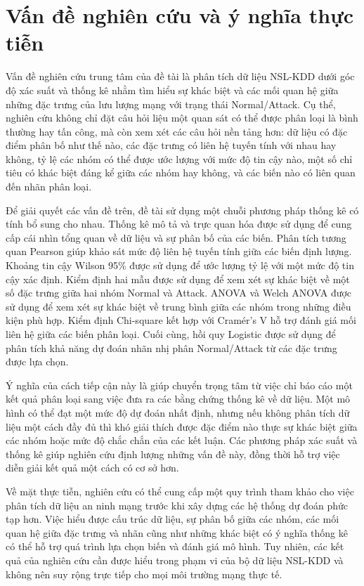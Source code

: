 \documentclass[../main.tex]{subfiles}
\begin{document}
\section{Vấn đề nghiên cứu và ý nghĩa thực tiễn}

Vấn đề nghiên cứu trung tâm của đề tài là phân tích dữ liệu NSL-KDD dưới góc độ xác suất và thống kê nhằm tìm hiểu sự khác biệt và các mối quan hệ giữa những đặc trưng của lưu lượng mạng với trạng thái Normal/Attack. Cụ thể, nghiên cứu không chỉ đặt câu hỏi liệu một quan sát có thể được phân loại là bình thường hay tấn công, mà còn xem xét các câu hỏi nền tảng hơn: dữ liệu có đặc điểm phân bố như thế nào, các đặc trưng có liên hệ tuyến tính với nhau hay không, tỷ lệ các nhóm có thể được ước lượng với mức độ tin cậy nào, một số chỉ tiêu có khác biệt đáng kể giữa các nhóm hay không, và các biến nào có liên quan đến nhãn phân loại.

Để giải quyết các vấn đề trên, đề tài sử dụng một chuỗi phương pháp thống kê có tính bổ sung cho nhau. Thống kê mô tả và trực quan hóa được sử dụng để cung cấp cái nhìn tổng quan về dữ liệu và sự phân bố của các biến. Phân tích tương quan Pearson giúp khảo sát mức độ liên hệ tuyến tính giữa các biến định lượng. Khoảng tin cậy Wilson 95\% được sử dụng để ước lượng tỷ lệ với một mức độ tin cậy xác định. Kiểm định hai mẫu được sử dụng để xem xét sự khác biệt về một số đặc trưng giữa hai nhóm Normal và Attack. ANOVA và Welch ANOVA được sử dụng để xem xét sự khác biệt về trung bình giữa các nhóm trong những điều kiện phù hợp. Kiểm định Chi-square kết hợp với Cramér's V hỗ trợ đánh giá mối liên hệ giữa các biến phân loại. Cuối cùng, hồi quy Logistic được sử dụng để phân tích khả năng dự đoán nhãn nhị phân Normal/Attack từ các đặc trưng được lựa chọn.

Ý nghĩa của cách tiếp cận này là giúp chuyển trọng tâm từ việc chỉ báo cáo một kết quả phân loại sang việc đưa ra các bằng chứng thống kê về dữ liệu. Một mô hình có thể đạt một mức độ dự đoán nhất định, nhưng nếu không phân tích dữ liệu một cách đầy đủ thì khó giải thích được đặc điểm nào thực sự khác biệt giữa các nhóm hoặc mức độ chắc chắn của các kết luận. Các phương pháp xác suất và thống kê giúp nghiên cứu định lượng những vấn đề này, đồng thời hỗ trợ việc diễn giải kết quả một cách có cơ sở hơn.

Về mặt thực tiễn, nghiên cứu có thể cung cấp một quy trình tham khảo cho việc phân tích dữ liệu an ninh mạng trước khi xây dựng các hệ thống dự đoán phức tạp hơn. Việc hiểu được cấu trúc dữ liệu, sự phân bố giữa các nhóm, các mối quan hệ giữa đặc trưng và nhãn cũng như những khác biệt có ý nghĩa thống kê có thể hỗ trợ quá trình lựa chọn biến và đánh giá mô hình. Tuy nhiên, các kết quả của nghiên cứu cần được hiểu trong phạm vi của bộ dữ liệu NSL-KDD và không nên suy rộng trực tiếp cho mọi môi trường mạng thực tế.
\end{document}
